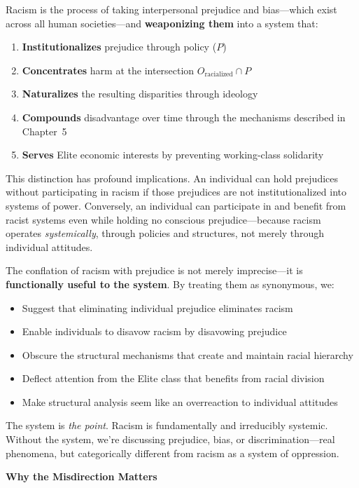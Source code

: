\documentclass[12pt,openany]{book}
\begin{document}
Racism is the process of taking interpersonal prejudice and bias---which exist across all human societies---and \textbf{weaponizing them} into a system that:
\begin{enumerate}
    \item \textbf{Institutionalizes} prejudice through policy ($P$)
    \item \textbf{Concentrates} harm at the intersection $O_{\text{racialized}} \cap P$
    \item \textbf{Naturalizes} the resulting disparities through ideology
    \item \textbf{Compounds} disadvantage over time through the mechanisms described in Chapter~5
    \item \textbf{Serves} Elite economic interests by preventing working-class solidarity
\end{enumerate}

This distinction has profound implications. An individual can hold prejudices without participating in racism if those prejudices are not institutionalized into systems of power. Conversely, an individual can participate in and benefit from racist systems even while holding no conscious prejudice---because racism operates \textit{systemically}, through policies and structures, not merely through individual attitudes.

The conflation of racism with prejudice is not merely imprecise---it is \textbf{functionally useful to the system}. By treating them as synonymous, we:
\begin{itemize}
    \item Suggest that eliminating individual prejudice eliminates racism
    \item Enable individuals to disavow racism by disavowing prejudice
    \item Obscure the structural mechanisms that create and maintain racial hierarchy
    \item Deflect attention from the Elite class that benefits from racial division
    \item Make structural analysis seem like an overreaction to individual attitudes
\end{itemize}

The system is \textit{the point}. Racism is fundamentally and irreducibly systemic. Without the system, we're discussing prejudice, bias, or discrimination---real phenomena, but categorically different from racism as a system of oppression.

\textbf{Why the Misdirection Matters}
\end{document}
